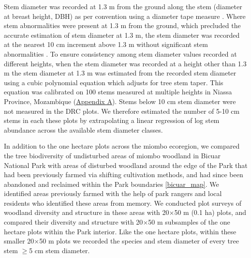 \documentclass[diversity,article,submit,moreauthors,pdftex]{Definitions/mdpi}
\begin{document}
Stem diameter was recorded at 1.3 m from the ground along the stem (diameter at breast height, DBH) as per convention using a diameter tape measure \citep{Kershaw2017}. Where stem abnormalities were present at 1.3 m from the ground, which precluded the accurate estimation of stem diameter at 1.3 m, the stem diameter was recorded at the nearest 10 cm increment above 1.3 m without significant stem abnormalities \citep{Kershaw2017}. To ensure consistency among stem diameter values recorded at different heights, when the stem diameter was recorded at a height other than 1.3 m the stem diameter at 1.3 m was estimated from the recorded stem diameter using a cubic polynomial equation which adjusts for tree stem taper. This equation was calibrated on 100 stems measured at multiple heights in Niassa Province, Mozambique (\hyperref[appendixa]{Appendix A}). Stems below 10 cm stem diameter were not measured in the DRC plots. We therefore estimated the number of 5-10 cm stems in each these plots by extrapolating a linear regression of log stem abundance across the available stem diameter classes.

In addition to the one hectare plots across the miombo ecoregion, we compared the tree biodiversity of undisturbed areas of miombo woodland in Bicuar National Park with areas of disturbed woodland around the edge of the Park that had been previously farmed via shifting cultivation methods, and had since been abandoned and reclaimed within the Park boundaries \autoref{bicuar_map}. We identified areas previously farmed with the help of park rangers and local residents who identified these areas from memory. We conducted \ndegradplots{} plot surveys of woodland diversity and structure in these areas with 20$\times$50 m (0.1 ha) plots, and compared their diversity and structure with 20$\times$50 m subsamples of the \nplotsbicuar{} one hectare plots within the Park interior. Like the one hectare plots, within these smaller 20$\times$50 m plots we recorded the species and stem diameter of every tree stem $\ge$5 cm stem diameter.
\end{document}
